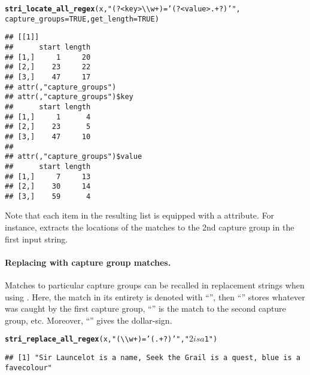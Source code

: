 \documentclass[nojss]{jss}\usepackage[]{graphicx}\usepackage[]{xcolor}
\makeatletter
\newcommand{\hlnum}[1]{\textcolor[rgb]{0.686,0.059,0.569}{#1}}%
\newcommand{\hlstr}[1]{\textcolor[rgb]{0.192,0.494,0.8}{#1}}%
\newcommand{\hlstd}[1]{\textcolor[rgb]{0.345,0.345,0.345}{#1}}%
\newcommand{\hlkwc}[1]{\textcolor[rgb]{0.333,0.667,0.333}{#1}}%
\newcommand{\hlkwd}[1]{\textcolor[rgb]{0.737,0.353,0.396}{\textbf{#1}}}%
\newenvironment{kframe}{%
 \def\at@end@of@kframe{}%
 \ifinner\ifhmode%
  \def\at@end@of@kframe{\end{minipage}}%
  \begin{minipage}{\columnwidth}%
 \fi\fi%
 \def\FrameCommand##1{\hskip\@totalleftmargin \hskip-\fboxsep
 \colorbox{shadecolor}{##1}\hskip-\fboxsep
     \hskip-\linewidth \hskip-\@totalleftmargin \hskip\columnwidth}%
 \MakeFramed {\advance\hsize-\width
   \@totalleftmargin\z@ \linewidth\hsize
   \@setminipage}}%
 {\par\unskip\endMakeFramed%
 \at@end@of@kframe}
\newenvironment{knitrout}{}{} %
\makeatother
\begin{document}
\begin{knitrout}
\color{fgcolor}\begin{kframe}
\begin{alltt}
\hlkwd{stri_locate_all_regex}\hlstd{(x,} \hlstr{"(?<key>\textbackslash{}\textbackslash{}w+)='(?<value>.+?)'"}\hlstd{,}
  \hlkwc{capture_groups}\hlstd{=}\hlnum{TRUE}\hlstd{,} \hlkwc{get_length}\hlstd{=}\hlnum{TRUE}\hlstd{)}
\end{alltt}
\begin{verbatim}
## [[1]]
##      start length
## [1,]     1     20
## [2,]    23     22
## [3,]    47     17
## attr(,"capture_groups")
## attr(,"capture_groups")$key
##      start length
## [1,]     1      4
## [2,]    23      5
## [3,]    47     10
## 
## attr(,"capture_groups")$value
##      start length
## [1,]     7     13
## [2,]    30     14
## [3,]    59      4
\end{verbatim}
\end{kframe}
\end{knitrout}

\noindent
Note that each item in the resulting list
is equipped with a  attribute.
For instance,
extracts the locations of the matches to the 2nd capture group
in the first input string.

\paragraph{Replacing with capture group matches.}
Matches to particular capture groups can be recalled in replacement strings
when using .
Here, the match in its entirety is denoted with ``'',  then
``'' stores whatever was caught by the first capture group,
``'' is the match to the second capture group, etc.
Moreover, ``\code{\textbackslash{}\$}'' gives the dollar-sign.


\begin{knitrout}
\color{fgcolor}\begin{kframe}
\begin{alltt}
\hlkwd{stri_replace_all_regex}\hlstd{(x,} \hlstr{"(\textbackslash{}\textbackslash{}w+)='(.+?)'"}\hlstd{,} \hlstr{"$2 is a $1"}\hlstd{)}
\end{alltt}
\begin{verbatim}
## [1] "Sir Launcelot is a name, Seek the Grail is a quest, blue is a favecolour"
\end{verbatim}
\end{kframe}
\end{knitrout}
\end{document}

